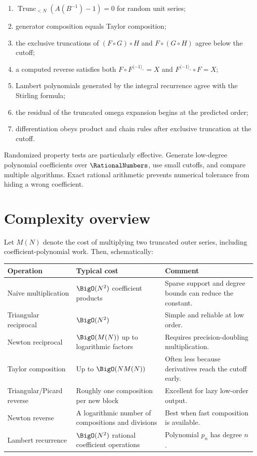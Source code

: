 \documentclass[11pt,oneside,openany]{book}
\newcommand{\TransseriesTruncateBelow}[2]{%
  \operatorname{Trunc}_{<#2}\!\left(#1\right)%
}
\newcommand{\compose}{\mathbin{\circ}}
\newcommand{\rev}{^{\langle-1\rangle_{\circ}}}
\begin{document}
\begin{enumerate}
\item \(\TransseriesTruncateBelow{A(B^{-1})-1}{N}=0\) for random unit series;
\item generator composition equals Taylor composition;
\item the exclusive truncations of \((F\compose G)\compose H\) and
      \(F\compose(G\compose H)\) agree below the cutoff;
\item a computed reverse satisfies both \(F\compose F\rev=X\) and
\(F\rev\compose F=X\);
\item Lambert polynomials generated by the integral recurrence agree with the
Stirling formula;
\item the residual of the truncated omega expansion begins at the predicted
order;
\item differentiation obeys product and chain rules after exclusive
      truncation at the cutoff.
\end{enumerate}

Randomized property tests are particularly effective.  Generate low-degree
polynomial coefficients over \(\RationalNumbers\), use small cutoffs, and compare
multiple algorithms.  Exact rational arithmetic prevents numerical tolerance
from hiding a wrong coefficient.

\section{Complexity overview}
Let \(M(N)\) denote the cost of multiplying two truncated outer series,
including coefficient-polynomial work.  Then, schematically:

\begin{center}
\begin{tabularx}{0.94\textwidth}{@{}>{\raggedright\arraybackslash}p{}>{\raggedright\arraybackslash}p{}X@{}}
\toprule
Operation & Typical cost & Comment \\
\midrule
Naive multiplication & \(\BigO(N^2)\) coefficient products
& Sparse support and degree bounds can reduce the constant. \\
Triangular reciprocal & \(\BigO(N^2)\)
& Simple and reliable at low order. \\
Newton reciprocal & \(\BigO(M(N))\) up to logarithmic factors
& Requires precision-doubling multiplication. \\
Taylor composition & Up to \(\BigO(NM(N))\)
& Often less because derivatives reach the cutoff early. \\
Triangular/Picard reverse & Roughly one composition per new block
& Excellent for lazy low-order output. \\
Newton reverse & A logarithmic number of compositions and divisions
& Best when fast composition is available. \\
Lambert recurrence & \(\BigO(N^2)\) rational coefficient operations
& Polynomial \(p_n\) has degree \(n\). \\
\bottomrule
\end{tabularx}
\end{center}
\end{document}
